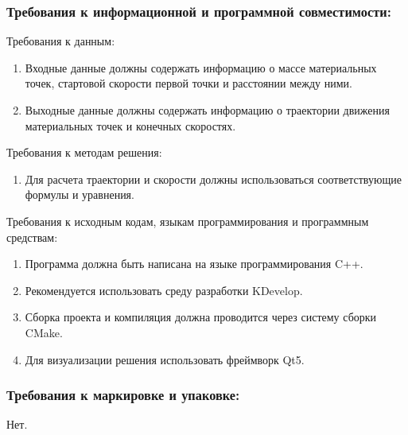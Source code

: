  \subsubsection*{Требования к информационной и программной совместимости:}
 Требования к данным:
 \begin{enumerate}
  \item Входные данные должны содержать информацию о массе материальных точек, стартовой скорости первой точки и расстоянии между ними.
  \item Выходные данные должны содержать информацию о траектории движения материальных точек и конечных скоростях.\newline
 \end{enumerate}

 Требования к методам решения:
 \begin{enumerate}
  \item Для расчета траектории и скорости должны использоваться соответствующие формулы и уравнения.\newline
 \end{enumerate}

 Требования к исходным кодам, языкам программирования и программным средствам:
 \begin{enumerate}
  \item Программа должна быть написана на языке программирования C++.
  \item Рекомендуется использовать среду разработки KDevelop.
  \item Сборка проекта и компиляция должна проводится через систему сборки CMake.
  \item Для визуализации решения использовать фреймворк Qt5.\newline
 \end{enumerate}

 \subsubsection*{Требования к маркировке и упаковке:}
 Нет.\newline

